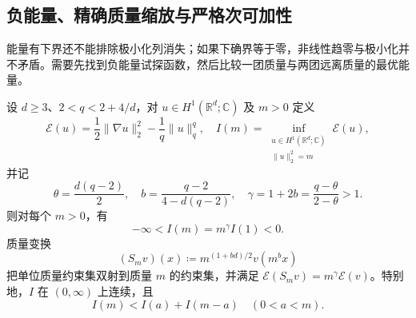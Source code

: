 \subsection{负能量、精确质量缩放与严格次可加性}

\label{b2:subsec:F-energy-scaling}

能量有下界还不能排除极小化列消失；如果下确界等于零，非线性趋零与极小化并不矛盾。需要先找到负能量试探函数，然后比较一团质量与两团远离质量的最优能量。

\begin{proposition}[质量缩放与严格次可加性]
\label{b2:prop:F-energy-scaling}
设 \(d\ge3\)、\(2<q<2+4/d\)，对 \(u\in H^1(\mathbb R^d;\mathbb C)\) 及 \(m>0\) 定义
\[
 \mathcal E(u)=\frac12\|\nabla u\|_2^2-\frac1q\|u\|_q^q,
 \quad
 I(m)=\inf_{\substack{u\in H^1(\mathbb R^d;\mathbb C)\\
                       \|u\|_2^2=m}}\mathcal E(u),
\]
并记
\[
 \theta=\frac{d(q-2)}2,
 \quad b=\frac{q-2}{4-d(q-2)},
 \quad \gamma=1+2b=\frac{q-\theta}{2-\theta}>1.
\]
则对每个 \(m>0\)，有
\begin{equation}
\label{b2:eq:F-exact-mass-scaling}
 -\infty<I(m)=m^\gamma I(1)<0.
\end{equation}
质量变换
\begin{equation}
\label{b2:eq:F-mass-transform}
 (S_m v)(x)\coloneqq m^{(1+bd)/2}v(m^b x)
\end{equation}
把单位质量约束集双射到质量 \(m\) 的约束集，并满足
\(\mathcal E(S_m v)=m^\gamma\mathcal E(v)\)。特别地，\(I\) 在 \((0,\infty)\) 上连续，且
\begin{equation}
\label{b2:eq:F-strict-subadditivity}
 I(m)<I(a)+I(m-a)
 \quad(0<a<m).
\end{equation}
\end{proposition}
